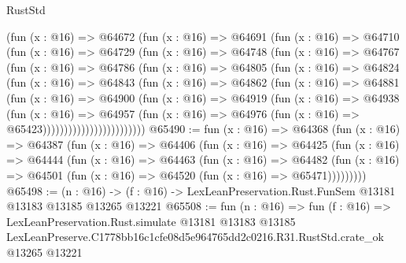 \begin{lexlean}{RustStd}
\begin{coremodule}
                (fun (x : @16) =>
                @64672
                  (fun (x : @16) =>
                  @64691
                    (fun (x : @16) =>
                    @64710
                      (fun (x : @16) =>
                      @64729
                        (fun (x : @16) =>
                        @64748
                          (fun (x : @16) =>
                          @64767
                            (fun (x : @16) =>
                            @64786
                              (fun (x : @16) =>
                              @64805
                                (fun (x : @16) =>
                                @64824
                                  (fun (x : @16) =>
                                  @64843
                                    (fun (x : @16) =>
                                    @64862
                                      (fun (x : @16) =>
                                      @64881
                                        (fun (x : @16) =>
                                        @64900
                                          (fun (x : @16) =>
                                          @64919
                                            (fun (x : @16) =>
                                            @64938
                                              (fun (x : @16) =>
                                              @64957
                                                (fun (x : @16) =>
                                                @64976
                                                  (fun (x : @16) => @65423))))))))))))))))))))))))
@65490 := fun (x : @16) =>
  @64368
    (fun (x : @16) =>
    @64387
      (fun (x : @16) =>
      @64406
        (fun (x : @16) =>
        @64425
          (fun (x : @16) =>
          @64444
            (fun (x : @16) =>
            @64463
              (fun (x : @16) =>
              @64482
                (fun (x : @16) => @64501 (fun (x : @16) => @64520 (fun (x : @16) => @65471)))))))))
@65498 := (n : @16) ->
  (f : @16) -> LexLeanPreservation.Rust.FunSem @13181 @13183 @13185 @13265 @13221
@65508 := fun (n : @16) =>
  fun (f : @16) =>
  LexLeanPreservation.Rust.simulate
    @13181
    @13183
    @13185
    LexLeanPreserve.C1778bb16c1cfe08d5e964765dd2c0216.R31.RustStd.crate_ok
    @13265
    @13221
\end{coremodule}
\end{lexlean}
